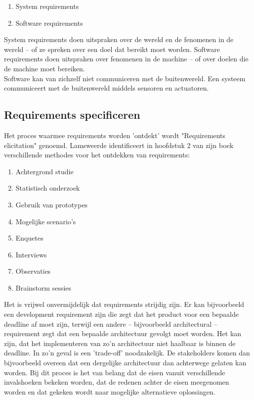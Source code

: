 \documentclass{article}
\begin{document}
	\begin{enumerate}
		\item System requirements
		\item Software requirements
	\end{enumerate}
	System requirements doen uitspraken over de wereld en de fenomenen in de wereld -- of ze spreken over een doel dat bereikt moet worden. Software requirements doen uitspraken over fenomenen in de machine -- of over doelen die de machine moet bereiken. \\
	Software kan van zichzelf niet communiceren met de buitenwereld. Een systeem communiceert met de buitenwereld middels sensoren en actuatoren. \par
		
		\subsection{Requirements specificeren}
		
		Het proces waarmee requirements worden 'ontdekt' wordt "Requirements elicitation" genoemd. Lamsweerde identificeert in hoofdstuk 2 van zijn boek verschillende methodes voor het ontdekken van requirements:

		\begin{enumerate}
			\item Achtergrond studie
			\item Statistisch onderzoek
			\item Gebruik van prototypes
			\item Mogelijke scenario's 
			\item Enquetes
			\item Interviews
			\item Observaties
			\item Brainstorm sessies
		\end{enumerate}
Het is vrijwel onvermijdelijk dat requirements strijdig zijn. Er kan bijvoorbeeld een development requirement zijn die zegt dat het product voor een bepaalde deadline af moet zijn, terwijl een andere -- bijvoorbeeld architectural -- requirement zegt dat een bepaalde architectuur gevolgt moet worden. Het kan zijn, dat het implementeren van zo'n architectuur niet haalbaar is binnen de deadline. In zo'n geval is een 'trade-off' noodzakelijk. De stakeholders komen dan bijvoorbeeld overeen dat een dergelijke architectuur dan achterwege gelaten kan worden. Bij dit proces is het van belang dat de eisen vanuit verschillende invalshoeken bekeken worden, dat de redenen achter de eisen meegenomen worden en dat gekeken wordt naar mogelijke alternatieve oplossingen.
		
\end{document}
